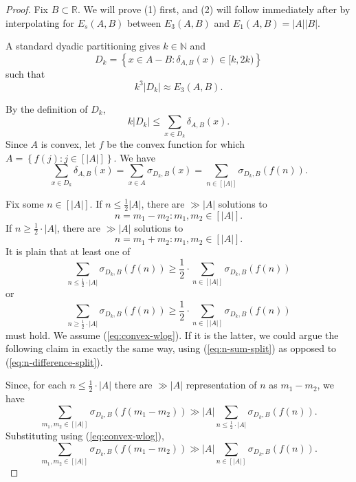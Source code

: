 \documentclass[reqno]{amsart}
\numberwithin{equation}{section}
\begin{document}
\begin{proof}
Fix \(B \subset \mathbb{R} \). We will prove (1) first, and (2) will follow immediately
after by interpolating for \(E_{s}(A,B) \) between \(E_3(A,B)\) and \(E_1(A,B)= \left\lvert A \right\rvert \left\lvert B \right\rvert  \). 

A standard dyadic partitioning gives \(k \in \mathbb{N} \) and
\[
    D_{k} = \left\{ x \in  A- B : \delta_{A,B} (x) \in [k,2k) \right\}  
\]
such that
\[
    k^{3} \left\lvert D_{k}  \right\rvert \approx E_3(A,B)
.\]

By the definition of \(D_{k} \),
\[
    k \left\lvert D_{k}  \right\rvert \leq \sum _{x \in D_{k} } \delta_{A,B} (x)
.\]
Since \(A\) is convex, let \(f\) be the convex function for which \(A = \left\{ f(j) : j \in \left[ \left\lvert A \right\rvert  \right]  \right\} \).
We have
\[
    \sum _{x \in D_{k} } \delta_{A,B} (x) = \sum _{x \in A} \sigma_{D_{k} ,B} (x) = \sum _{ n \in [\left\lvert A \right\rvert ]} \sigma_{D_{k} ,B} \left( f(n) \right) 
.\]

Fix some \(n \in [\left\lvert A \right\rvert ]\). If \(n \leq \frac{1}{2} \left\lvert A \right\rvert \), there are \(\gg \left\lvert A \right\rvert   \) solutions to
\begin{equation} \label{eq:n-difference-split}
    n = m_1 - m_2 : m_1,m_2 \in [\left\lvert A \right\rvert ].
\end{equation}
If \(n\geq  \frac{1}{2} \cdot \left\lvert A \right\rvert \), there are \(\gg \left\lvert A \right\rvert  \)
solutions to
\begin{equation} \label{eq:n-sum-split}
    n = m_1 + m_2 : m_1,m_2 \in [\left\lvert A \right\rvert ].
\end{equation}
It is plain that at least one of
\begin{equation} \label{eq:convex-wlog}
    \sum _{n \leq \frac{1}{2} \cdot \left\lvert A \right\rvert } \sigma_{D_{k} ,B} (f(n)) \geq \frac{1}{2} \cdot  \sum _{n \in [\left\lvert A \right\rvert ]} \sigma_{D_{k},B }(f(n)) 
\end{equation}
or
\[
    \sum _{n \geq  \frac{1}{2} \cdot \left\lvert A \right\rvert } \sigma_{D_{k} ,B} (f(n))\geq \frac{1}{2} \cdot  \sum _{n \in [\left\lvert A \right\rvert ]} \sigma_{D_{k},B }(f(n)) 
\]
must hold.
We assume (\ref{eq:convex-wlog}). If it is the latter, we could argue the following claim
in exactly the same way, using (\ref{eq:n-sum-split}) as opposed to (\ref{eq:n-difference-split}).


Since, for each \(n \leq \frac{1}{2} \cdot \left\lvert A \right\rvert \) there are \(\gg \left\lvert A \right\rvert \) representation
of \(n\) as \(m_1-m_2\), we have
\[
    \sum _{m_1,m_2 \in [\left\lvert A \right\rvert ]} \sigma_{D_{k} ,B} (f(m_1-m_2)) \gg \left\lvert A \right\rvert  \sum _{n \leq \frac{1}{2} \cdot \left\lvert A \right\rvert } \sigma_{D_{k} ,B} (f(n))
.\]
Substituting using (\ref{eq:convex-wlog}),
\[
    \sum _{m_1,m_2 \in [\left\lvert A \right\rvert ]} \sigma_{D_{k} ,B} (f(m_1-m_2)) \gg \left\lvert A \right\rvert \sum _{n \in [\left\lvert A \right\rvert ]} \sigma_{D_{k} ,B} (f(n))   
.\]


\end{proof}
\end{document}
